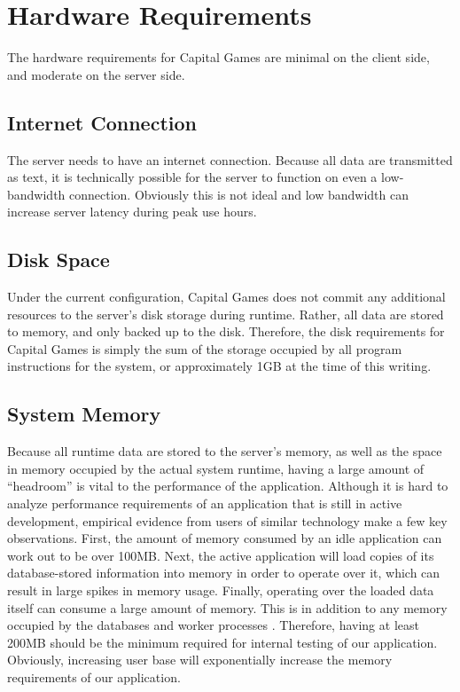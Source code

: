 \section{Hardware Requirements}

The hardware requirements for Capital Games are minimal
on the client side, and moderate on the server side.

\subsection{Internet Connection}

The server needs to have an internet connection. Because
all data are transmitted as text, it is technically possible
for the server to function on even a low-bandwidth connection.
Obviously this is not ideal and low bandwidth can increase
server latency during peak use hours. 

\subsection{Disk Space}

Under the current configuration, Capital Games does not commit
any additional resources to the server's disk storage during
runtime. Rather, all data are stored to memory, and only
backed up to the disk. Therefore, the disk requirements for
Capital Games is simply the sum of the storage occupied by
all program instructions for the system, or approximately
1GB at the time of this writing.

\subsection{System Memory}

Because all runtime data are stored to the server's memory, as
well as the space in memory occupied by the actual system
runtime, having a large amount of ``headroom'' is vital to the
performance of the application. Although it is hard to
analyze performance requirements of an application that is
still in active development, empirical evidence from users of
similar technology make a few key observations. First, the
amount of memory consumed by an idle application can work
out to be over 100MB. Next, the active application will load
copies of its database-stored information into memory in order
to operate over it, which can result in large spikes in memory
usage. Finally, operating over the loaded data itself can 
consume a large amount of memory. This is in addition to any
memory occupied by the databases and worker processes \cite{so:railsmem}.
Therefore, having at least 200MB should be the minimum required
for internal testing of our application. Obviously, increasing
user base will exponentially increase the memory requirements
of our application.

